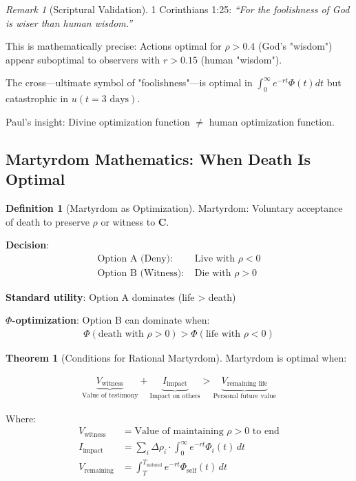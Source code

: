 \documentclass[11pt,a4paper]{article}
\theoremstyle{definition}
\newtheorem{definition}{Definition}[section]
\newtheorem{theorem}{Theorem}[section]
\theoremstyle{remark}
\newtheorem{remark}{Remark}[section]
\begin{document}
\begin{enumerate}
\begin{remark}[Scriptural Validation]
1 Corinthians 1:25: \textit{``For the foolishness of God is wiser than human wisdom.''}

This is mathematically precise: Actions optimal for \(\rho > 0.4\) (God's "wisdom") appear suboptimal to observers with \(r > 0.15\) (human "wisdom").

The cross—ultimate symbol of "foolishness"—is optimal in \(\int_0^\infty e^{-rt} \Phi(t) dt\) but catastrophic in \(u(t=3\text{ days})\).

Paul's insight: Divine optimization function \(\neq\) human optimization function.
\end{remark}

\subsection{Martyrdom Mathematics: When Death Is Optimal}

\begin{definition}[Martyrdom as Optimization]
Martyrdom: Voluntary acceptance of death to preserve \(\rho\) or witness to \(\mathbf{C}\).

\textbf{Decision}:
\begin{align}
\text{Option A (Deny): } &\text{Live with } \rho < 0 \\
\text{Option B (Witness): } &\text{Die with } \rho > 0
\end{align}

\textbf{Standard utility}: Option A dominates (life > death)

\textbf{\(\Phi\)-optimization}: Option B can dominate when:
\begin{align}
\Phi(\text{death with } \rho > 0) > \Phi(\text{life with } \rho < 0)
\end{align}
\end{definition}

\begin{theorem}[Conditions for Rational Martyrdom]
Martyrdom is optimal when:

\begin{align}
\underbrace{V_{\text{witness}}}_{\text{Value of testimony}} + \underbrace{I_{\text{impact}}}_{\text{Impact on others}} > \underbrace{V_{\text{remaining life}}}_{\text{Personal future value}}
\end{align}

Where:
\begin{align}
V_{\text{witness}} &= \text{Value of maintaining } \rho > 0 \text{ to end} \\
I_{\text{impact}} &= \sum_{i} \Delta \rho_i \cdot \int_0^\infty e^{-rt} \Phi_i(t) \, dt \\
V_{\text{remaining}} &= \int_T^{T_{\text{natural}}} e^{-rt} \Phi_{\text{self}}(t) \, dt
\end{align}


\end{theorem}
\end{enumerate}
\end{document}
